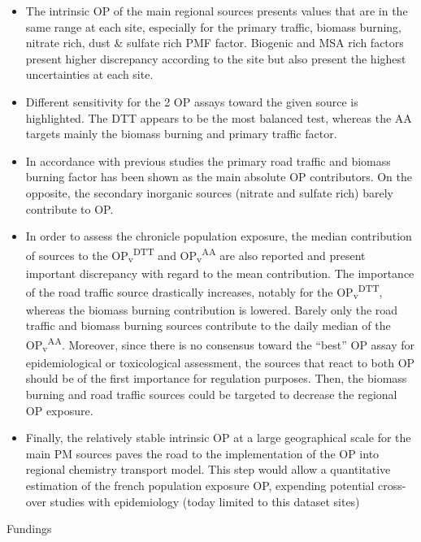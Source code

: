 \documentclass[
]{article}
\begin{document}
\begin{itemize}
\item
  The intrinsic OP of the main regional sources presents values that are
  in the same range at each site, especially for the primary traffic,
  biomass burning, nitrate rich, dust \& sulfate rich PMF factor.
  Biogenic and MSA rich factors present higher discrepancy according to
  the site but also present the highest uncertainties at each site.
\item
  Different sensitivity for the 2 OP assays toward the given source is
  highlighted. The DTT appears to be the most balanced test, whereas the
  AA targets mainly the biomass burning and primary traffic factor.
\item
  In accordance with previous studies the primary road traffic and
  biomass burning factor has been shown as the main absolute OP
  contributors. On the opposite, the secondary inorganic sources
  (nitrate and sulfate rich) barely contribute to OP.
\item
  In order to assess the chronicle population exposure, the median
  contribution of sources to the
  OP\textsubscript{v}\textsuperscript{DTT} and
  OP\textsubscript{v}\textsuperscript{AA} are also reported and present
  important discrepancy with regard to the mean contribution. The
  importance of the road traffic source drastically increases, notably
  for the OP\textsubscript{v}\textsuperscript{DTT}, whereas the biomass
  burning contribution is lowered. Barely only the road traffic and
  biomass burning sources contribute to the daily median of the
  OP\textsubscript{v}\textsuperscript{AA}. Moreover, since there is no
  consensus toward the ``best'' OP assay for epidemiological or
  toxicological assessment, the sources that react to both OP should be
  of the first importance for regulation purposes. Then, the biomass
  burning and road traffic sources could be targeted to decrease the
  regional OP exposure.
\item
  Finally, the relatively stable intrinsic OP at a large geographical
  scale for the main PM sources paves the road to the implementation of
  the OP into regional chemistry transport model. This step would allow
  a quantitative estimation of the french population exposure OP,
  expending potential cross-over studies with epidemiology (today
  limited to this dataset sites)
\end{itemize}

Fundings
\end{document}
